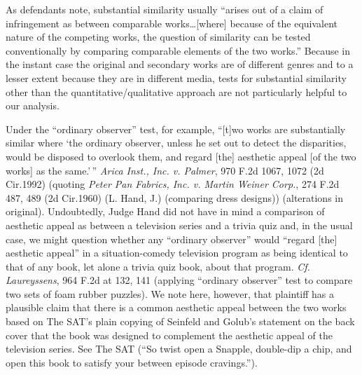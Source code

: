 
As defendants note, substantial similarity usually ``arises out of a claim of
infringement as between comparable works\ldots [where] because of the equivalent
nature of the competing works, the question of similarity can be tested
conventionally by comparing comparable elements of the two works.'' Because in
the instant case the original and secondary works are of different genres and
to a lesser extent because they are in different media, tests for substantial
similarity other than the quantitative/qualitative approach are not
particularly helpful to our analysis.

Under the ``ordinary observer'' test, for example, ``[t]wo works are
substantially similar where `the ordinary observer, unless he
set out to detect the disparities, would be disposed to overlook them, and
regard [the] aesthetic appeal [of the two works] as the same.'\,'' \emph{Arica
Inst.,
Inc. v. Palmer}, 970 F.2d 1067, 1072 (2d Cir.1992) (quoting \emph{Peter Pan Fabrics,
Inc. v. Martin Weiner Corp.}, 274 F.2d 487, 489 (2d Cir.1960) (L. Hand, J.)
(comparing dress designs)) (alterations in original). Undoubtedly, Judge Hand
did not have in mind a comparison of aesthetic appeal as between a television
series and a trivia quiz and, in the usual case, we might question whether any
``ordinary observer'' would ``regard [the] aesthetic appeal'' in a
situation-comedy television program as being identical to that of any book, let
alone a trivia quiz book, about that program. \emph{Cf.} \emph{Laureyssens}, 964
F.2d at 132,
141 (applying ``ordinary observer'' test to compare two sets of foam rubber
puzzles). We note here, however, that plaintiff has a plausible claim that
there is a common aesthetic appeal between the two works based on The SAT's
plain copying of Seinfeld and Golub's statement on the back cover that the book
was designed to complement the aesthetic appeal of the television series. See
The SAT (``So twist open a Snapple, double-dip a chip, and open this book to
satisfy your between episode cravings.'').

